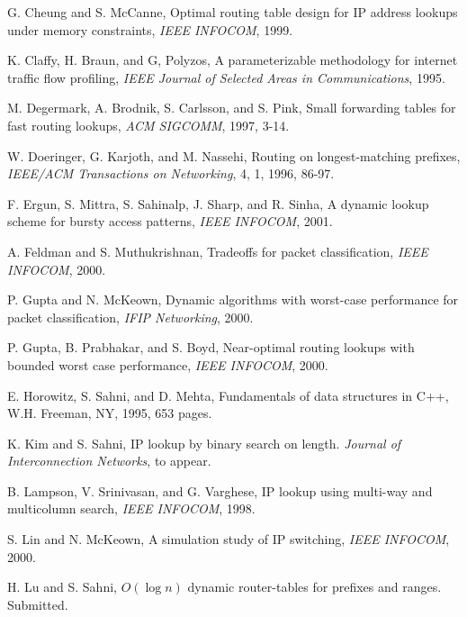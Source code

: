 \begin{thebibliography}{99}

G. Cheung and S. McCanne,
Optimal routing table design for IP address lookups under
memory constraints,
{\em IEEE INFOCOM}, 1999.

K. Claffy, H. Braun, and G, Polyzos,
A parameterizable methodology for internet traffic flow profiling,
{\em IEEE Journal of Selected Areas in Communications}, 1995.

M. Degermark, A. Brodnik, S. Carlsson, and S. Pink,
Small forwarding tables for fast routing lookups,
{\em ACM SIGCOMM}, 1997, 3-14.

W. Doeringer, G. Karjoth, and M. Nassehi,
Routing on longest-matching prefixes,
{\em IEEE/ACM Transactions on Networking}, 4, 1, 1996, 86-97.

F. Ergun, S. Mittra, S. Sahinalp, J. Sharp, and R. Sinha,
A dynamic lookup scheme for bursty access patterns,
{\em IEEE INFOCOM}, 2001.

A. Feldman and S. Muthukrishnan,
Tradeoffs for packet classification,
{\em IEEE INFOCOM}, 2000.

P. Gupta and N. McKeown,
Dynamic algorithms with worst-case performance for packet
classification,
{\em IFIP Networking}, 2000.

P. Gupta, B. Prabhakar, and S. Boyd,
Near-optimal routing lookups with bounded worst case performance,
{\em IEEE INFOCOM}, 2000.

E. Horowitz, S. Sahni, and D. Mehta, Fundamentals of data structures in C++,
W.H. Freeman, NY, 1995, 653 pages.

K. Kim and S. Sahni,
IP lookup by binary search on length.
{\em Journal of Interconnection Networks}, to appear.

 B. Lampson, V. Srinivasan, and G. Varghese,
IP lookup using multi-way and multicolumn search,
{\em IEEE INFOCOM}, 1998.

S. Lin and N. McKeown,
A simulation study of IP switching,
{\em IEEE INFOCOM}, 2000.


H. Lu and S. Sahni,
$O(\log n)$ dynamic router-tables for prefixes and ranges.
Submitted.



\end{thebibliography}
